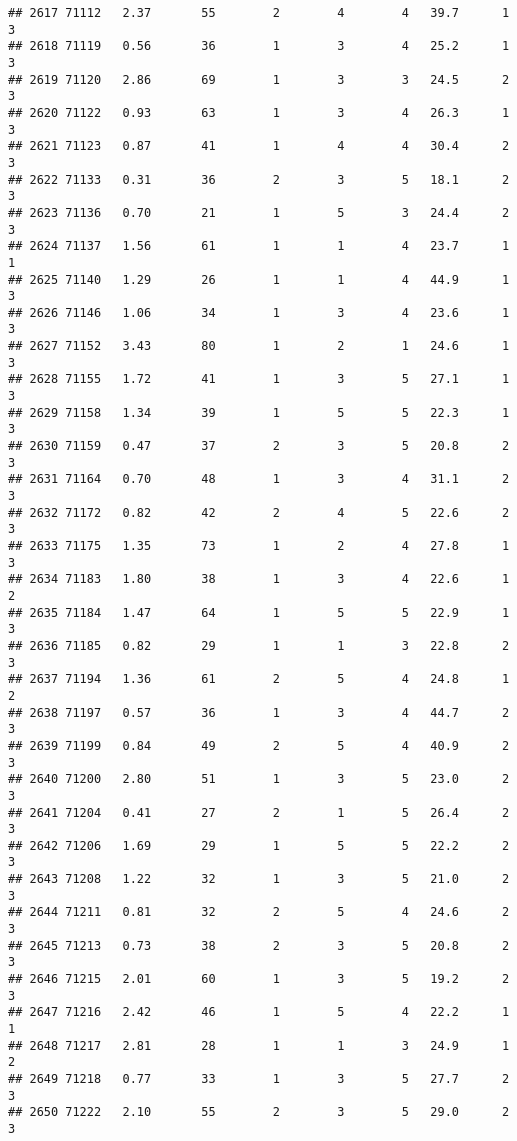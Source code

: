 \documentclass[
]{article}
\begin{document}
\begin{verbatim}
## 2617 71112   2.37       55        2        4        4   39.7      1      3
## 2618 71119   0.56       36        1        3        4   25.2      1      3
## 2619 71120   2.86       69        1        3        3   24.5      2      3
## 2620 71122   0.93       63        1        3        4   26.3      1      3
## 2621 71123   0.87       41        1        4        4   30.4      2      3
## 2622 71133   0.31       36        2        3        5   18.1      2      3
## 2623 71136   0.70       21        1        5        3   24.4      2      3
## 2624 71137   1.56       61        1        1        4   23.7      1      1
## 2625 71140   1.29       26        1        1        4   44.9      1      3
## 2626 71146   1.06       34        1        3        4   23.6      1      3
## 2627 71152   3.43       80        1        2        1   24.6      1      3
## 2628 71155   1.72       41        1        3        5   27.1      1      3
## 2629 71158   1.34       39        1        5        5   22.3      1      3
## 2630 71159   0.47       37        2        3        5   20.8      2      3
## 2631 71164   0.70       48        1        3        4   31.1      2      3
## 2632 71172   0.82       42        2        4        5   22.6      2      3
## 2633 71175   1.35       73        1        2        4   27.8      1      3
## 2634 71183   1.80       38        1        3        4   22.6      1      2
## 2635 71184   1.47       64        1        5        5   22.9      1      3
## 2636 71185   0.82       29        1        1        3   22.8      2      3
## 2637 71194   1.36       61        2        5        4   24.8      1      2
## 2638 71197   0.57       36        1        3        4   44.7      2      3
## 2639 71199   0.84       49        2        5        4   40.9      2      3
## 2640 71200   2.80       51        1        3        5   23.0      2      3
## 2641 71204   0.41       27        2        1        5   26.4      2      3
## 2642 71206   1.69       29        1        5        5   22.2      2      3
## 2643 71208   1.22       32        1        3        5   21.0      2      3
## 2644 71211   0.81       32        2        5        4   24.6      2      3
## 2645 71213   0.73       38        2        3        5   20.8      2      3
## 2646 71215   2.01       60        1        3        5   19.2      2      3
## 2647 71216   2.42       46        1        5        4   22.2      1      1
## 2648 71217   2.81       28        1        1        3   24.9      1      2
## 2649 71218   0.77       33        1        3        5   27.7      2      3
## 2650 71222   2.10       55        2        3        5   29.0      2      3

\end{verbatim}
\end{document}

